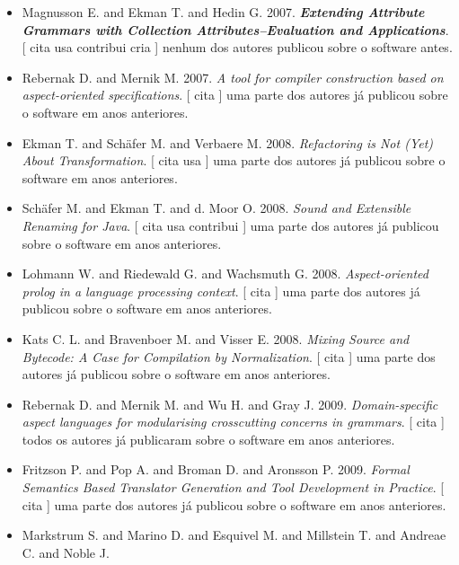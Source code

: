 \begin{itemize}
      [
          cita
          usa
      ]
nenhum dos autores publicou sobre o software antes.
\item Magnusson E. and Ekman T. and Hedin G.
      2007.
        \textbf{\textit{ Extending Attribute Grammars with Collection Attributes--Evaluation and Applications}}.
      [
          cita
          usa
          contribui
          cria
      ]
nenhum dos autores publicou sobre o software antes.
\item Rebernak D. and Mernik M.
      2007.
        \textit{ A tool for compiler construction based on aspect-oriented specifications}.
      [
          cita
      ]
uma parte dos autores já publicou sobre o software em anos anteriores.
\item Ekman T. and Sch\"{a}fer M. and Verbaere M.
      2008.
        \textit{ Refactoring is Not (Yet) About Transformation}.
      [
          cita
          usa
      ]
uma parte dos autores já publicou sobre o software em anos anteriores.
\item Sch\"{a}fer M. and Ekman T. and d. Moor O.
      2008.
        \textit{ Sound and Extensible Renaming for Java}.
      [
          cita
          usa
          contribui
      ]
uma parte dos autores já publicou sobre o software em anos anteriores.
\item Lohmann W. and Riedewald G. and Wachsmuth G.
      2008.
        \textit{ Aspect-oriented prolog in a language processing context}.
      [
          cita
      ]
uma parte dos autores já publicou sobre o software em anos anteriores.
\item Kats C. L. and Bravenboer M. and Visser E.
      2008.
        \textit{ Mixing Source and Bytecode: A Case for Compilation by Normalization}.
      [
          cita
      ]
uma parte dos autores já publicou sobre o software em anos anteriores.
\item Rebernak D. and Mernik M. and Wu H. and Gray J.
      2009.
        \textit{ Domain-specific aspect languages for modularising crosscutting concerns in grammars}.
      [
          cita
      ]
todos os autores já publicaram sobre o software em anos anteriores.
\item Fritzson P. and Pop A. and Broman D. and Aronsson P.
      2009.
        \textit{ Formal Semantics Based Translator Generation and Tool Development in Practice}.
      [
          cita
      ]
uma parte dos autores já publicou sobre o software em anos anteriores.
\item Markstrum S. and Marino D. and Esquivel M. and Millstein T. and Andreae C. and Noble J.

\end{itemize}
